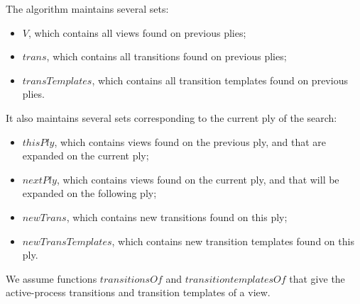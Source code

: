 
The algorithm maintains several sets:
%
\begin{itemize}
\item $V$, which contains all views found on previous plies;
\item $trans$, which contains all transitions found on previous plies;
\item $transTemplates$, which contains all transition templates found on
  previous plies.
\end{itemize}
%
It also maintains several sets corresponding to the current ply of the search:
\begin{itemize}
\item $thisPly$, which contains views found on the previous ply, and that are
  expanded on the current ply;
\item $nextPly$, which contains views found on the current ply, and that will
  be expanded on the following ply;
\item $newTrans$, which contains new transitions found on this ply;
\item $newTransTemplates$, which contains new transition templates found on
  this ply.
\end{itemize}

We assume functions $transitionsOf$ and $transitiontemplatesOf$ that give the
active-process transitions and transition templates of a view.  

